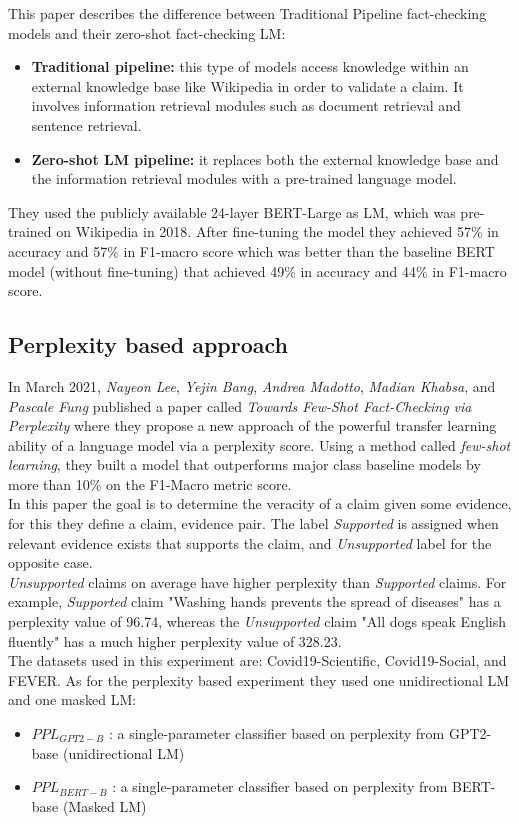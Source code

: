 \documentclass[conference]{IEEEtran}
\begin{document}
This paper describes the difference between Traditional Pipeline fact-checking models and their zero-shot fact-checking LM:

\begin{itemize}
\item \textbf{Traditional pipeline:} this type of models access knowledge within an external knowledge base like Wikipedia in order to validate a claim. It involves information retrieval modules such as document retrieval and sentence retrieval.
\item \textbf{Zero-shot LM pipeline:} it replaces both the external knowledge base and the information retrieval modules with a pre-trained language model.\\
\end{itemize}

They used the publicly available 24-layer BERT-Large as LM, which was pre-trained on Wikipedia in 2018. After fine-tuning the model they achieved 57\% in accuracy and 57\% in F1-macro score which was better than the baseline BERT model (without fine-tuning) that achieved 49\% in accuracy and 44\% in F1-macro score.

\subsection{Perplexity based approach \cite{lee2021towards} \cite{lee2020misinformation}}
In March 2021, \textit{Nayeon Lee}, \textit{Yejin Bang}, \textit{Andrea Madotto}, \textit{Madian Khabsa}, and \textit{Pascale Fung} published a paper called \textit{Towards Few-Shot Fact-Checking via Perplexity} where they propose a new approach of the powerful transfer learning ability of a language model via a perplexity score. Using a method called \textit{few-shot learning}, they built a model that outperforms major class baseline models by more than 10\% on the F1-Macro metric score.\\
In this paper the goal is to determine the veracity of a claim given some evidence, for this they define a {claim, evidence} pair. The label \emph{Supported} is assigned when relevant evidence exists that supports the claim, and \emph{Unsupported} label for the opposite case.\\
\emph{Unsupported} claims on average have higher perplexity than \emph{Supported} claims. For example, \emph{Supported} claim "Washing hands prevents the spread of diseases" has a perplexity value of 96.74, whereas the \emph{Unsupported} claim "All dogs speak English fluently" has a much higher perplexity value of 328.23.\\
The datasets used in this experiment are: Covid19-Scientific, Covid19-Social, and FEVER. As for the perplexity based experiment they used one unidirectional LM and one masked LM:
\begin{itemize}
\item $PPL_{GPT2-B}$ : a single-parameter classifier based on perplexity from GPT2-base \cite{radford2019language} (unidirectional LM)
\item $PPL_{BERT-B}$ : a single-parameter classifier based on perplexity from BERT-base \cite{devlin2018bert} (Masked LM)\\
\end{itemize}
\end{document}
